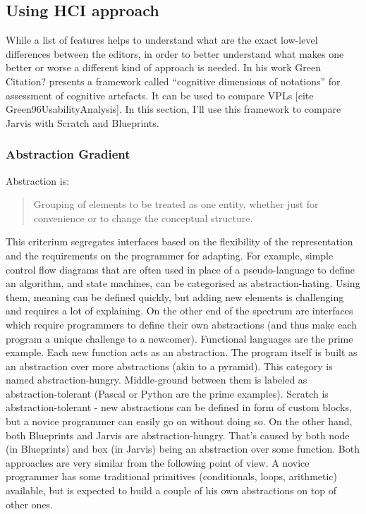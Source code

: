 \documentclass[11pt]{scrartcl}
\begin{document}
\subsection{Using HCI approach}
While a list of features helps to understand what are the exact low-level differences between the editors, in order to better understand what makes one better or worse a different kind of approach is needed. In his work Green {Citation?} presents a framework called “cognitive dimensions of notations” for assessment of cognitive artefacts. It can be used to compare VPLs [cite Green96UsabilityAnalysis]. In this section, I’ll use this framework to compare Jarvis with Scratch and Blueprints.
\subsubsection{Abstraction Gradient}
Abstraction is:
\blockquote[{\cite{Green96UsabilityAnalysis}}]{Grouping of elements to be treated as one entity, whether just for convenience or to change the conceptual structure.}
This criterium segregates interfaces based on the flexibility of the representation and the requirements on the programmer for adapting. For example, simple control flow diagrams that are often used in place of a pseudo-language to define an algorithm, and state machines, can be categorised as abstraction-hating. Using them, meaning can be defined quickly, but adding new elements is challenging and requires a lot of explaining. On the other end of the spectrum are interfaces which require programmers to define their own abstractions (and thus make each program a unique challenge to a newcomer). Functional languages are the prime example. Each new function acts as an abstraction. The program itself is built as an abstraction over more abstractions (akin to a pyramid). This category is named abstraction-hungry. Middle-ground between them is labeled as abstraction-tolerant (Pascal or Python are the prime examples).
Scratch is abstraction-tolerant - new abstractions can be defined in form of custom blocks, but a novice programmer can easily go on without doing so. On the other hand, both Blueprints and Jarvis are abstraction-hungry. That’s caused by both node (in Blueprints) and box (in Jarvis) being an abstraction over some function. Both approaches are very similar from the following point of view. A novice programmer has some traditional primitives (conditionals, loops, arithmetic) available, but is expected to build a couple of his own abstractions on top of other ones.
\end{document}
